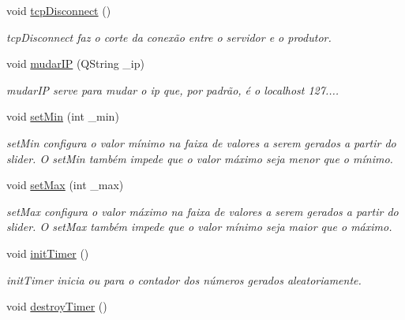 \begin{DoxyCompactItemize}
\mbox{\label{class_main_window_a4d22c4c7afc7ba0a2fa4c70515c85dda}} 
void \mbox{\hyperlink{class_main_window_a4d22c4c7afc7ba0a2fa4c70515c85dda}{tcp\+Disconnect}} ()
\begin{DoxyCompactList}\small\item\em tcp\+Disconnect faz o corte da conexão entre o servidor e o produtor. \end{DoxyCompactList}\item 
void \mbox{\hyperlink{class_main_window_aa428a7979ad9beb9c6ebf6478eb611b8}{mudar\+IP}} (Q\+String \+\_\+ip)
\begin{DoxyCompactList}\small\item\em mudar\+IP serve para mudar o ip que, por padrão, é o localhost 127.... \end{DoxyCompactList}\item 
void \mbox{\hyperlink{class_main_window_a32f19952203e037e8022343c290b596f}{set\+Min}} (int \+\_\+min)
\begin{DoxyCompactList}\small\item\em set\+Min configura o valor mínimo na faixa de valores a serem gerados a partir do slider. O set\+Min também impede que o valor máximo seja menor que o mínimo. \end{DoxyCompactList}\item 
void \mbox{\hyperlink{class_main_window_ad8a004156f79731b347b744e473006ba}{set\+Max}} (int \+\_\+max)
\begin{DoxyCompactList}\small\item\em set\+Max configura o valor máximo na faixa de valores a serem gerados a partir do slider. O set\+Max também impede que o valor mínimo seja maior que o máximo. \end{DoxyCompactList}\item 
\mbox{\label{class_main_window_a7fd62e78b41bf758052da7d1451699cb}} 
void \mbox{\hyperlink{class_main_window_a7fd62e78b41bf758052da7d1451699cb}{init\+Timer}} ()
\begin{DoxyCompactList}\small\item\em init\+Timer inicia ou para o contador dos números gerados aleatoriamente. \end{DoxyCompactList}\item 
\mbox{\label{class_main_window_a3ad9aa1924e5560afa1ee473da5c272e}} 
void \mbox{\hyperlink{class_main_window_a3ad9aa1924e5560afa1ee473da5c272e}{destroy\+Timer}} ()

\end{DoxyCompactItemize}
